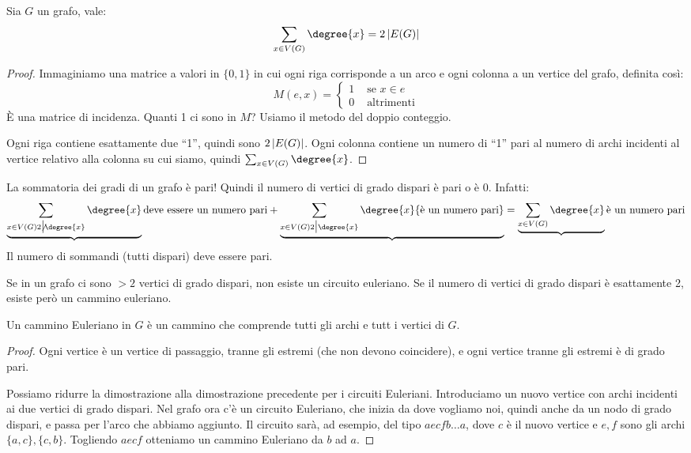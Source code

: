 \begin{prop}
	\label{grado_n_archi}
	Sia $G$ un grafo, vale:
	\[
		\sum_{x \in V(G)} \degree{x} = 2 \abs{E(G)}
	\]
\end{prop}

\begin{proof}
	Immaginiamo una matrice a valori in $\{0,1\}$ in cui ogni riga corrisponde a un arco e ogni colonna a un vertice del grafo, definita cos\`i:
	\[
		M(e,x) =
		\begin{cases}
			1 & \text{ se } x \in e \\
			0 & \text{ altrimenti}
		\end{cases}
	\]
	\`E una matrice di incidenza.
	Quanti 1 ci sono in $M$?
	Usiamo il metodo del doppio conteggio.

	Ogni riga contiene esattamente due ``1'', quindi sono $2 \left\lvert{E(G)}\right\rvert$.
	Ogni colonna contiene un numero di ``1'' pari al numero di archi incidenti al vertice relativo alla colonna su cui siamo, quindi $\sum_{x \in V(G)} \degree{x}$.
\end{proof}

La sommatoria dei gradi di un grafo \`e pari!
Quindi il numero di vertici di grado dispari \`e pari o \`e 0.
Infatti:
\[
	\underbrace{\sum_{x \in V(G) \\ 2 \not\divides \degree{x}} \degree{x}}{\text{deve essere un numero pari}} +
	\underbrace{\sum_{x \in V(G) \\ 2 \divides \degree{x}} \degree{x}{\text{\`e un numero pari}}} =
	\underbrace{\sum_{x \in V(G)} \degree{x}}{\text{\`e un numero pari}}
\]
Il numero di sommandi (tutti dispari) deve essere pari.

Se in un grafo ci sono $>2$ vertici di grado dispari, non esiste un circuito euleriano.
Se il numero di vertici di grado dispari \`e esattamente 2, esiste per\`o un cammino euleriano.
\begin{defn}
	Un cammino Euleriano in $G$ \`e un cammino che comprende tutti gli archi e tutt i vertici di $G$.
\end{defn}

\begin{proof}
	Ogni vertice \`e un vertice di passaggio, tranne gli estremi (che non devono coincidere), e ogni vertice tranne gli estremi \`e di grado pari.

	Possiamo ridurre la dimostrazione alla dimostrazione precedente per i circuiti Euleriani.
	Introduciamo un nuovo vertice con archi incidenti ai due vertici di grado dispari.
	Nel grafo ora c'\`e un circuito Euleriano, che inizia da dove vogliamo noi, quindi anche da un nodo di grado dispari, e passa per l'arco che abbiamo aggiunto.
	Il circuito sar\`a, ad esempio, del tipo $aecfb \dots a$, dove $c$ \`e il nuovo vertice e $e,f$ sono gli archi $\{a,c\},\{c,b\}$.
	Togliendo $aecf$ otteniamo un cammino Euleriano da $b$ ad $a$.
\end{proof}


